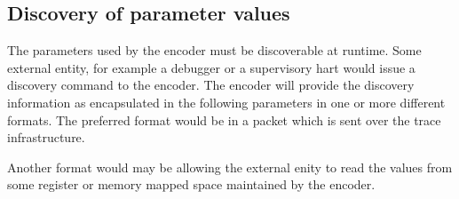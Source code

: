 \subsection {Discovery of parameter values}

The parameters used by the encoder must be discoverable at
runtime. Some external entity, for example a debugger or a supervisory
hart would issue a discovery command to the encoder. The encoder will
provide the discovery information as encapsulated in the following
parameters in one or more different formats.  The preferred format
would be in a packet which is sent over the trace infrastructure.

Another format would may be allowing the external enity to read the
values from some register or memory mapped space maintained by the
encoder.

